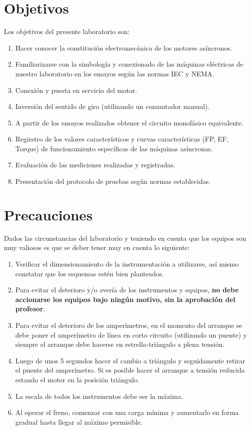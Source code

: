 \documentclass[a4paper,11pt]{article}
\begin{document}
\section{Objetivos}
Los objetivos del presente laboratorio son:
\begin{enumerate}
    \item Hacer conocer la constitución electromecánica de los motores asíncronos.
    \item Familiarizarse con la simbología y conexionado de las máquinas eléctricas de nuestro laboratorio en los ensayos según las normas IEC y NEMA.
    \item Conexión y puesta en servicio del motor.
    \item Inversión del sentido de giro (utilizando un conmutador manual).
    \item A partir de los ensayos realizados obtener el circuito monofásico equivalente.
    \item Regirstro de los valores característicos y curvas características (FP, EF, Torque) de funcionamiento específicas de las máquinas asíncronas.
    \item Evaluación de las mediciones realizadas y registradas.
    \item Presentación del protocolo de pruebas según normas establecidas.
\end{enumerate}
\section{Precauciones}
Dados las circunstancias del laboratorio y teniendo en cuenta que los equipos son muy valiosos es que se deber tener muy en cuenta lo siguiente:
\begin{enumerate}
    \item Verificar el dimensionamiento de la instrumentación a utilizarse, así mismo constatar que los esquemas estén bien planteados.
    \item Para evitar el deterioro y/o avería de los instrumentos y equipos, \textbf{no debe accionarse los equipos bajo ningún motivo, sin la aprobación del profesor}.
    \item Para evitar el deterioro de los amperímetros, en el momento del arranque se debe poner el amperímetro de línea en corto circuito (utilizando un puente) y siempre el arranque debe hacerse en estrella-triángulo a plena tensión.
    \item Luego de unos 5 segundos hacer el cambio a triángulo y seguidamente retirar el puente del amperímetro. Si es posible hacer el arranque a tensión reducida estando el motor en la posición triángulo.
    \item La escala de todos los instrumentos debe ser la máxima.
    \item Al operar el freno, comenzar con una carga mínima y aumentarlo en forma gradual hasta llegar al máximo permisible.
\end{enumerate}
\end{document}
